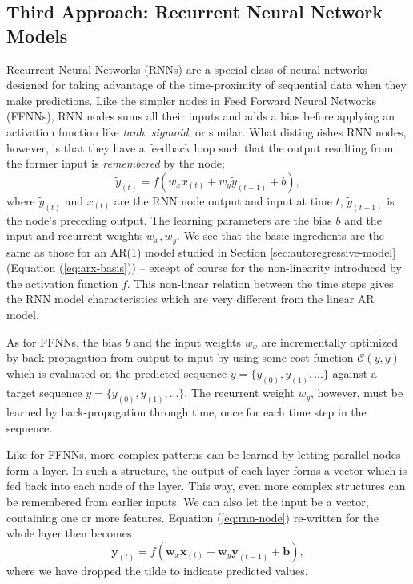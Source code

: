 \documentclass[]{article}
\begin{document}
\subsection{Third Approach: Recurrent Neural Network Models} \label{sec:neural-model}
Recurrent Neural Networks (RNNs) are a special class of neural networks designed for taking advantage of the time-proximity of sequential data when they make predictions. Like the simpler nodes in Feed Forward Neural Networks (FFNNs), RNN nodes sums all their inputs and adds a bias before applying an activation function like \textit{tanh}, \textit{sigmoid}, or similar. What distinguishes RNN nodes, however, is that they have a feedback loop such that the output resulting from the former input is \textit{remembered} by the node;
\begin{equation} \label{eq:rnn-node}
	\tilde{y}_{(t)} = f(w_x x_{(t)} + w_y \tilde{y}_{(t-1)} + b),
\end{equation} 
where $\tilde{y}_{(t)}$ and $x_{(t)}$ are the RNN node output and input at time $t$, $\tilde{y}_{(t-1)}$ is the node's preceding output. The learning parameters are the bias $b$ and the input and recurrent weights $w_x, w_y$. We see that the basic ingredients are the same as those for an AR(1) model studied in Section \ref{sec:autoregressive-model} (Equation (\ref{eq:arx-basis})) -- except of course for the non-linearity introduced by the activation function $f$. This non-linear relation between the time steps gives the RNN model characteristics which are very different from the linear AR model.

As for FFNNs, the bias $b$ and the input weights $w_x$ are incrementally optimized by back-propagation from output to input by using some cost function $\mathcal{C}(y, \tilde{y})$ which is evaluated on the predicted sequence $\tilde{y} = \{\tilde{y}_{(0)}, \tilde{y}_{(1)}, ...\}$ against a target sequence $y = \{y_{(0)}, y_{(1)}, ...\}$. The recurrent weight $w_y$, however, must be learned by back-propagation through time, once for each time step in the sequence.

Like for FFNNs, more complex patterns can be learned by letting parallel nodes form a layer. In such a structure, the output of each layer forms a vector which is fed back into each node of the layer. This way, even more complex structures can be remembered from earlier inputs. We can also let the input be a vector, containing one or more features. Equation (\ref{eq:rnn-node}) re-written for the whole layer then becomes
\begin{equation} \label{eq:rnn-layer}
	\mathbf{y}_{(t)} = f(\mathbf{w}_x \mathbf{x}_{(t)} + \mathbf{w}_y \mathbf{y}_{(t-1)} + \mathbf{b}),
\end{equation} 
where we have dropped the tilde to indicate predicted values.
\end{document}
